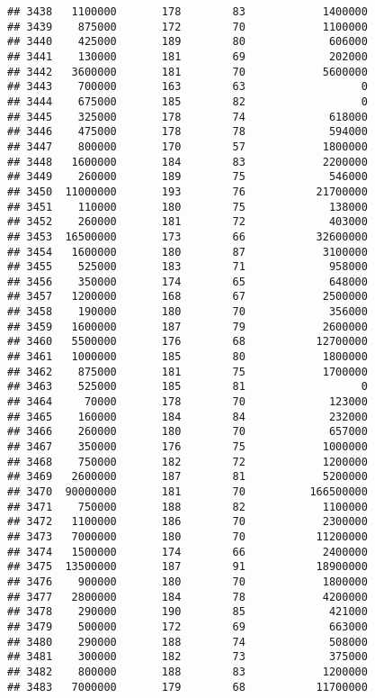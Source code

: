 \documentclass[
]{article}
\begin{document}
\begin{verbatim}
## 3438   1100000       178        83            1400000
## 3439    875000       172        70            1100000
## 3440    425000       189        80             606000
## 3441    130000       181        69             202000
## 3442   3600000       181        70            5600000
## 3443    700000       163        63                  0
## 3444    675000       185        82                  0
## 3445    325000       178        74             618000
## 3446    475000       178        78             594000
## 3447    800000       170        57            1800000
## 3448   1600000       184        83            2200000
## 3449    260000       189        75             546000
## 3450  11000000       193        76           21700000
## 3451    110000       180        75             138000
## 3452    260000       181        72             403000
## 3453  16500000       173        66           32600000
## 3454   1600000       180        87            3100000
## 3455    525000       183        71             958000
## 3456    350000       174        65             648000
## 3457   1200000       168        67            2500000
## 3458    190000       180        70             356000
## 3459   1600000       187        79            2600000
## 3460   5500000       176        68           12700000
## 3461   1000000       185        80            1800000
## 3462    875000       181        75            1700000
## 3463    525000       185        81                  0
## 3464     70000       178        70             123000
## 3465    160000       184        84             232000
## 3466    260000       180        70             657000
## 3467    350000       176        75            1000000
## 3468    750000       182        72            1200000
## 3469   2600000       187        81            5200000
## 3470  90000000       181        70          166500000
## 3471    750000       188        82            1100000
## 3472   1100000       186        70            2300000
## 3473   7000000       180        70           11200000
## 3474   1500000       174        66            2400000
## 3475  13500000       187        91           18900000
## 3476    900000       180        70            1800000
## 3477   2800000       184        78            4200000
## 3478    290000       190        85             421000
## 3479    500000       172        69             663000
## 3480    290000       188        74             508000
## 3481    300000       182        73             375000
## 3482    800000       188        83            1200000
## 3483   7000000       179        68           11700000

\end{verbatim}
\end{document}

